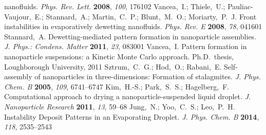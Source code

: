 \documentclass[journal=langd5,manuscript=article]{achemso}
\begin{document}
\begin{mcitethebibliography}{71}
  nanofluids. \emph{Phys. Rev. Lett.} \textbf{2008}, \emph{100}, 176102\relax
\mciteBstWouldAddEndPuncttrue
\mciteSetBstMidEndSepPunct{\mcitedefaultmidpunct}
{\mcitedefaultendpunct}{\mcitedefaultseppunct}\relax
\EndOfBibitem
{}
Vancea,~I.; Thiele,~U.; Pauliac-Vaujour,~E.; Stannard,~A.; Martin,~C.~P.;
  Blunt,~M.~O.; Moriarty,~P.~J. Front instabilities in evaporatively dewetting
  nanofluids. \emph{Phys. Rev. E} \textbf{2008}, \emph{78}, 041601\relax
\mciteBstWouldAddEndPuncttrue
\mciteSetBstMidEndSepPunct{\mcitedefaultmidpunct}
{\mcitedefaultendpunct}{\mcitedefaultseppunct}\relax
\EndOfBibitem
{}
Stannard,~A. Dewetting-mediated pattern formation in nanoparticle assemblies.
  \emph{J. Phys.: Condens. Matter} \textbf{2011}, \emph{23}, 083001\relax
\mciteBstWouldAddEndPuncttrue
\mciteSetBstMidEndSepPunct{\mcitedefaultmidpunct}
{\mcitedefaultendpunct}{\mcitedefaultseppunct}\relax
\EndOfBibitem
{}
Vancea,~I. Pattern formation in nanoparticle suspensions: a Kinetic Monte Carlo
  approach. Ph.D.\ thesis, Loughborough University, 2011\relax
\mciteBstWouldAddEndPuncttrue
\mciteSetBstMidEndSepPunct{\mcitedefaultmidpunct}
{\mcitedefaultendpunct}{\mcitedefaultseppunct}\relax
\EndOfBibitem
{}
Sztrum,~C.~G.; Hod,~O.; Rabani,~E. Self-assembly of nanoparticles in
  three-dimensions: Formation of stalagmites. \emph{J. Phys. Chem. B}
  \textbf{2005}, \emph{109}, 6741--6747\relax
\mciteBstWouldAddEndPuncttrue
\mciteSetBstMidEndSepPunct{\mcitedefaultmidpunct}
{\mcitedefaultendpunct}{\mcitedefaultseppunct}\relax
\EndOfBibitem
{}
Kim,~H.-S.; Park,~S.~S.; Hagelberg,~F. Computational approach to drying a
  nanoparticle-suspended liquid droplet. \emph{J. Nanoparticle Research}
  \textbf{2011}, \emph{13}, 59--68\relax
\mciteBstWouldAddEndPuncttrue
\mciteSetBstMidEndSepPunct{\mcitedefaultmidpunct}
{\mcitedefaultendpunct}{\mcitedefaultseppunct}\relax
\EndOfBibitem
{}
Jung,~N.; Yoo,~C.~S.; Leo,~P.~H. Instability Deposit Patterns in an Evaporating
  Droplet. \emph{J. Phys. Chem. B} \textbf{2014}, \emph{118}, 2535--2543\relax
\mciteBstWouldAddEndPuncttrue
\mciteSetBstMidEndSepPunct{\mcitedefaultmidpunct}
{\mcitedefaultendpunct}{\mcitedefaultseppunct}\relax
\EndOfBibitem
{}

\end{mcitethebibliography}
\end{document}
